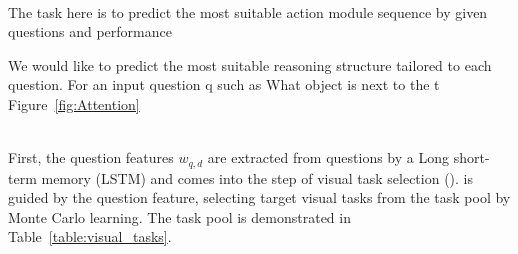 \\
The task here is to predict the most suitable action module sequence by given questions and performance

We would like to predict the most suitable reasoning
structure tailored to each question. For an input question q
such as What object is next to the t
Figure~\ref{fig:Attention}





\\
First, the question features $w_{q,d}$ are extracted from questions by a Long short-term memory (LSTM) and comes into the step of visual task selection ().  is guided by the question feature, selecting target visual tasks from the task pool by Monte Carlo learning. The task pool is demonstrated in Table~\ref{table:visual_tasks}.



